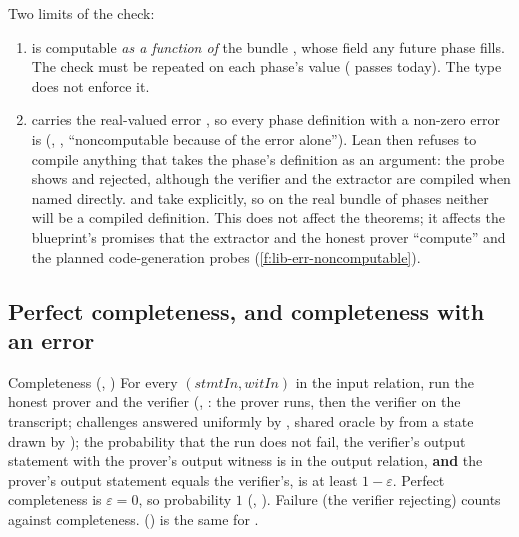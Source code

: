 Two limits of the check:
\begin{enumerate}
\item {} is computable \emph{as a function of} the bundle
  , whose  field any future phase fills. The check must be
  repeated on each phase's  value ( passes today). The
  type does not enforce it.
\item {} carries the real-valued error , so every phase
  definition with a non-zero error is  (,
  \allowbreak{}\allowbreak{}, \enquote{noncomputable because of the error
  alone}). Lean then refuses to compile anything that takes the phase's definition as an argument:
  the probe  shows \allowbreak{}\allowbreak{} and
   rejected, although the verifier
  and the extractor are compiled when named directly. \allowbreak{}\allowbreak{}\allowbreak{}
  and  take  explicitly, so on the real bundle of phases neither
  will be a compiled definition. This does not affect the theorems; it affects the blueprint's
  promises that the extractor and the honest prover \enquote{compute} and the planned
  code-generation probes (\cref{f:lib-err-noncomputable}).
\end{enumerate}

\subsection{Perfect completeness, and completeness with an error}\label{sec:gen-lib-ark-completeness}

\begin{define}{Completeness (, )}
For every $(\mathit{stmtIn}, \mathit{witIn})$ in the input relation, run the honest prover and the
verifier (, : the prover runs, then the verifier
on the transcript; challenges answered uniformly by , shared oracle by
 from a state drawn by ); the probability that the run does not fail, the
verifier's output statement with the prover's output witness is in the output relation,
\textbf{and} the prover's output statement equals the verifier's, is at least $1 - \varepsilon$.
Perfect completeness is $\varepsilon = 0$, so probability $1$
(\allowbreak{}, ). Failure (the verifier rejecting) counts
against completeness. \allowbreak{} () is the same for
.
\end{define}

